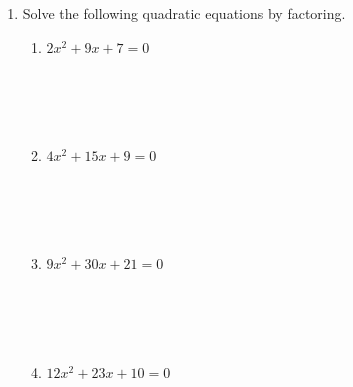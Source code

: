 \documentclass[12pt]{article}
\begin{document}
\begin{enumerate}
    \item Solve the following quadratic equations by factoring.
    \begin{enumerate}
        \item $2x^2 + 9x + 7 = 0$
        \[
        \begin{array}{c}
        \\ \\ \\ \\ \\ \\ \\ \\ \\ \\ \\ \\
        \end{array}
        \]

        \item $4x^2 + 15x + 9 = 0$
        \[
        \begin{array}{c}
        \\ \\ \\ \\ \\ \\ \\ \\ \\ \\ \\ \\
        \end{array}
        \]

        \item $9x^2 + 30x + 21 = 0$
        \[
        \begin{array}{c}
        \\ \\ \\ \\ \\ \\ \\ \\ \\ \\ \\ \\
        \end{array}
        \]

        \item $12x^2 + 23x + 10 = 0$
        \[
        \begin{array}{c}
        \\ \\ \\ \\ \\ \\ \\ \\ \\ \\ \\ \\
        \end{array}
        \]


\end{enumerate}
\end{enumerate}
\end{document}
